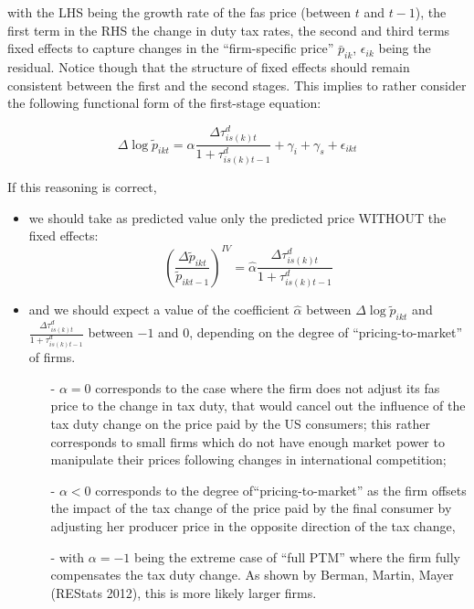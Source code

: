 \documentclass[11pt,twoside, authoryear]{elsarticle}
\begin{document}
\noindent with the LHS being the growth rate of the fas price (between $t$ and $t-1$), the first term in the RHS the change in duty tax rates, the second and third terms fixed effects to capture changes in the ``firm-specific price'' $\bar{p}_{ik}$, $\epsilon_{ik}$ being the residual. Notice though that the structure of fixed effects should remain consistent between the first and the second stages. This implies to rather consider the following functional form of the first-stage equation:

\begin{equation}
\Delta \log \widetilde{p}_{ikt} = \alpha\frac{\Delta \tau^d_{is(k)t}}{1+\tau_{is(k)t-1}^d} +\gamma_{i} +\gamma_{s}+\epsilon_{ikt} \label{eq:firststage_Deltalog}
\end{equation}

If this reasoning is correct,
\begin{itemize}
\item we should take as predicted value only the predicted price WITHOUT the fixed effects:
$$\left(\frac{\Delta \widetilde{p}_{ikt}}{\widetilde{p}_{ikt-1}}\right)^{IV} = \widehat{\alpha}\frac{\Delta \tau^d_{is(k)t}}{1+\tau_{is(k)t-1}^d} $$
\item and we should expect a value of the coefficient $\widehat{\alpha}$ between $\Delta \log \widetilde{p}_{ikt}$ and $\frac{\Delta \tau^d_{is(k)t}}{1+\tau_{is(k)t-1}^d} $ between $-1$ and $0$, depending on the degree of ``pricing-to-market'' of firms.
    \begin{itemize}
    \item[-] $\alpha = 0$ corresponds to the case where the firm does not adjust its fas price to the change in tax duty, that would cancel out the influence of the tax duty change on the price paid by the US consumers; this rather corresponds to small firms which do not have enough market power to manipulate their prices following changes in international competition;
    \item[-] $\alpha <0$ corresponds to the degree of``pricing-to-market'' as the firm offsets the impact of the tax change of the price paid by the final consumer by adjusting her producer price in the opposite direction of the tax change,
    \item[-] with $\alpha = -1$ being the extreme case of ``full PTM'' where the firm fully compensates the tax duty change. As shown by Berman, Martin, Mayer (REStats 2012), this is more likely larger firms.
    \end{itemize}
\end{itemize}
\end{document}
